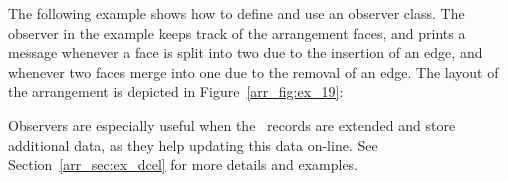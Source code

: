 The following example shows how to define and use an observer
class. The observer in the example keeps track of the arrangement
faces, and prints a message whenever a face is split into two due
to the insertion of an edge, and whenever two faces merge into one
due to the removal of an edge. The layout of the arrangement is
depicted in Figure~\ref{arr_fig:ex_19}:


Observers are especially useful when the \dcel\ records are
extended and store additional data, as they help updating this
data on-line. See Section~\ref{arr_sec:ex_dcel} for more details
and examples.
